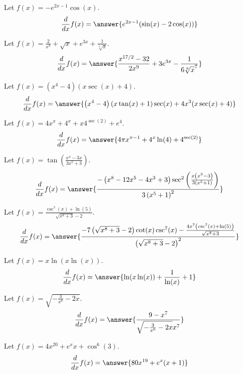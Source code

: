 \documentclass{ximera}
\begin{document}
\begin{shuffle}
\begin{exercise}
Let $f(x)=-e^{2 x-1} \cos (x)$.
\[
\ddx f(x) = \answer{e^{2 x-1} (\sin (x)-2 \cos (x))}
\]
\end{exercise}

\begin{exercise}
Let $f(x)=\frac{2}{x^8}+\sqrt{x}+e^{3 x}+\frac{1}{\sqrt[6]{x}}$.
\[
\ddx f(x) = \answer{\frac{x^{17/2}-32}{2 x^9}+3 e^{3 x}-\frac{1}{6 \sqrt[6]{x}^7}}
\]
\end{exercise}

\begin{exercise}
Let $f(x)=\left(x^4-4\right) (x \sec (x)+4)$.
\[
\ddx f(x) = \answer{\left(x^4-4\right) (x \tan (x)+1) \sec (x)+4 x^3 (x \sec (x)+4)}
\]
\end{exercise}

\begin{exercise}
Let $f(x)=4 x^{\pi }+4^x+x 4^{\sec (2)}+e^4$.
\[
\ddx f(x) = \answer{4 \pi  x^{\pi -1}+4^x \ln (4)+4^{\sec (2)}}
\]
\end{exercise}

\begin{exercise}
Let $f(x)=\tan \left(\frac{x^4-3 x}{3 x^5+3}\right)$.
\[
\ddx f(x) = \answer{\frac{-\left(x^8-12 x^5-4 x^3+3\right) \sec ^2\left(\frac{x \left(x^3-3\right)}{3 \left(x^5+1\right)}\right)}{3 \left(x^5+1\right)^2}}
\]
\end{exercise}

\begin{exercise}
Let $f(x)=\frac{\csc ^7(x)+\ln (5)}{\sqrt{x^8+3}-2}$.
\[
\ddx f(x) = \answer{\frac{-7 \left(\sqrt{x^8+3}-2\right) \cot (x) \csc ^7(x)-\frac{4 x^7 \left(\csc ^7(x)+\ln (5)\right)}{\sqrt{x^8+3}}}{\left(\sqrt{x^8+3}-2\right)^2}}
\]
\end{exercise}

\begin{exercise}
Let $f(x)=x \ln (x \ln (x))$.
\[
\ddx f(x) = \answer{\ln (x \ln (x))+\frac{1}{\ln (x)}+1}
\]
\end{exercise}

\begin{exercise}
Let $f(x)=\sqrt{-\frac{3}{x^6}-2 x}$.
\[
\ddx f(x) = \answer{\frac{9-x^7}{\sqrt{-\frac{3}{x^6}-2 x} x^7}}
\]
\end{exercise}

\begin{exercise}
Let $f(x)=4 x^{20}+e^x x+\cos ^6(3)$.
\[
\ddx f(x) = \answer{80 x^{19}+e^x (x+1)}
\]
\end{exercise}


\end{shuffle}
\end{document}
